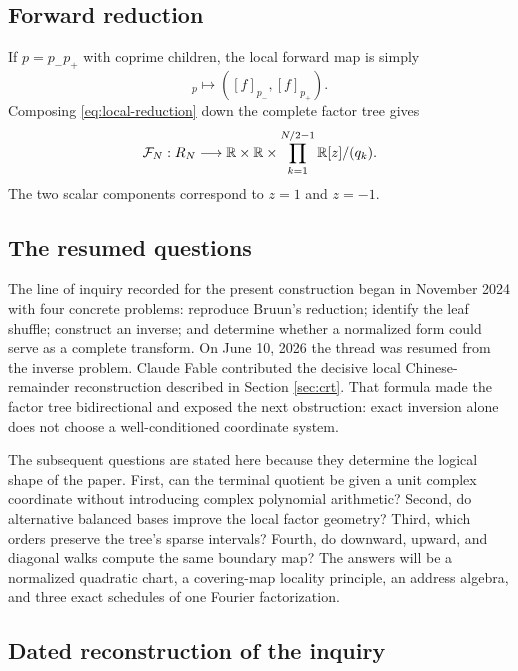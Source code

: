 \subsection{Forward reduction}

If $p=p_-p_+$ with coprime children, the local forward map is simply
\begin{equation}
 [f]_p\longmapsto([f]_{p_-},[f]_{p_+}).
 \label{eq:local-reduction}
\end{equation}
Composing \eqref{eq:local-reduction} down the complete factor tree gives
\begin{equation}
 \mathcal{F}_N:R_N\longrightarrow
 \mathbb{R}\times\mathbb{R}\times
 \prod_{k=1}^{N/2-1}\mathbb{R}[z]/(q_k).
 \label{eq:global-reduction}
\end{equation}
The two scalar components correspond to $z=1$ and $z=-1$.

\subsection{The resumed questions}

The line of inquiry recorded for the present construction began in November
2024 with four concrete problems: reproduce Bruun's reduction; identify the
leaf shuffle; construct an inverse; and determine whether a normalized form
could serve as a complete transform.  On June 10, 2026 the thread was resumed
from the inverse problem.  Claude Fable contributed the decisive local
Chinese-remainder reconstruction described in Section \ref{sec:crt}.  That
formula made the factor tree bidirectional and exposed the next obstruction:
exact inversion alone does not choose a well-conditioned coordinate system.

The subsequent questions are stated here because they determine the logical
shape of the paper.  First, can the terminal quotient be given a unit complex
coordinate without introducing complex polynomial arithmetic?  Second, do
alternative balanced bases improve the local factor geometry?  Third, which
orders preserve the tree's sparse intervals?  Fourth, do downward, upward, and
diagonal walks compute the same boundary map?  The answers will be a normalized
quadratic chart, a covering-map locality principle, an address algebra, and
three exact schedules of one Fourier factorization.

\subsection{Dated reconstruction of the inquiry}

